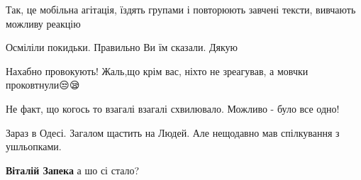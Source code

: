 \begin{itemize}
Так, це мобільна агітація, їздять групами і повторюють завчені тексти, вивчають можливу реакцію

 
Осміліли покидьки. Правильно Ви їм сказали. Дякую

 
Нахабно провокують! Жаль,що крім вас, ніхто не зреагував, а мовчки проковтнули😒😪

\begin{itemize}
 
Не факт, що когось то взагалі взагалі схвилювало. Можливо - було все одно!
\end{itemize}

 
Зараз в Одесі. Загалом щастить на Людей. Але нещодавно мав спілкування з ушльопками.

\begin{itemize}
 
\textbf{Віталій Запека} а шо сі стало?

 

\end{itemize}
\end{itemize}
